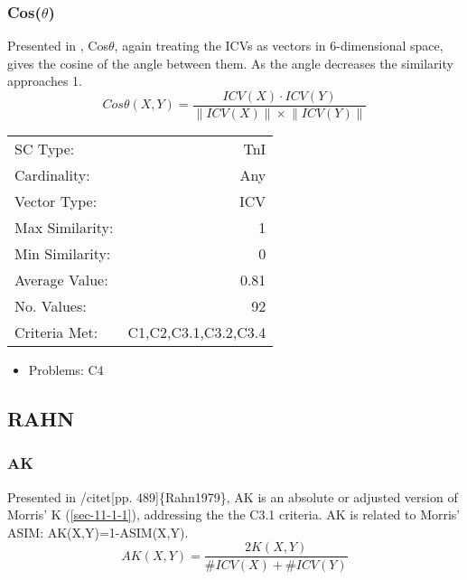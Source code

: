 \documentclass{article}
\begin{document}
\subsubsection{Cos($\theta$)}
\label{sec-11-4-3}

Presented in \citet{Rogers1992}, Cos$\theta$, again treating the ICVs as
vectors in 6-dimensional space, gives the cosine of the angle between
them. As the angle decreases the similarity approaches 1.
$$Cos\theta(X,Y)=\frac{ICV(X)\cdot
ICV(Y)}{\left\|ICV(X)\right\|\times \left\|ICV(Y)\right\|}$$

\begin{center}
\begin{tabular}{lr}
 SC Type:         &                   TnI  \\
 Cardinality:     &                   Any  \\
 Vector Type:     &                   ICV  \\
 Max Similarity:  &                     1  \\
 Min Similarity:  &                     0  \\
 Average Value:   &                  0.81  \\
 No. Values:      &                    92  \\
 Criteria Met:    &  C1,C2,C3.1,C3.2,C3.4  \\
\end{tabular}
\end{center}


\begin{itemize}
\item Problems: C4
\end{itemize}
\subsection{RAHN}
\label{sec-11-5}
\subsubsection{AK}
\label{sec-11-5-1}

Presented in /citet[pp. 489]\{Rahn1979\}, AK is an absolute or adjusted
version of Morris' K (\ref{sec-11-1-1}), addressing the the C3.1 criteria. AK is
related to Morris' ASIM: AK(X,Y)=1-ASIM(X,Y).  
$$AK\left(X,Y\right)=\frac{2K\left(X,Y\right)}{\#ICV\left(X\right)+\#ICV\left(Y\right)}$$
\end{document}
